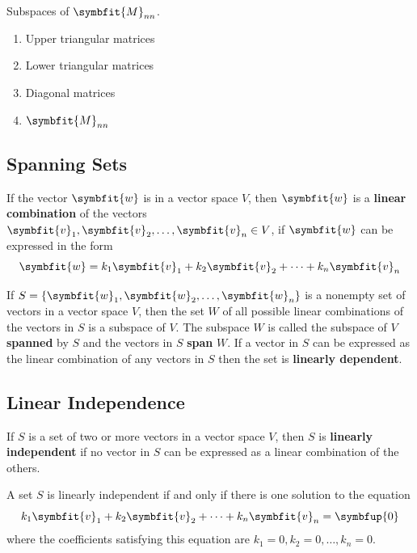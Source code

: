 \documentclass{article}
\begin{document}
	\begin{theorem}
		Subspaces of $\symbfit{M}_{nn}$.
		\begin{enumerate}
			\item Upper triangular matrices
			\item Lower triangular matrices
			\item Diagonal matrices
			\item $\symbfit{M}_{nn}$
		\end{enumerate}
	\end{theorem}
	\subsection{Spanning Sets}
	\begin{definition}
		If the vector $\symbfit{w}$ is in a vector space $V$, then $\symbfit{w}$ is a \textbf{linear combination} of the vectors $\symbfit{v}_1, \symbfit{v}_2, \dots, \symbfit{v}_n \in V$, if $\symbfit{w}$ can be expressed in the form
		\begin{equation*}
			\symbfit{w} = k_1 \symbfit{v}_1 + k_2 \symbfit{v}_2 + \cdots + k_n \symbfit{v}_n
		\end{equation*}
	\end{definition}
	\begin{theorem}
		If $S=\left\{ \symbfit{w}_1, \symbfit{w}_2, \dots, \symbfit{w}_n \right\}$ is a nonempty set of vectors in a vector space $V$, then the set $W$ of all possible linear combinations of the vectors in $S$ is a subspace of $V$. The subspace $W$ is called the subspace of $V$ \textbf{spanned} by $S$ and the vectors in $S$ \textbf{span} $W$. If a vector in $S$ can be expressed as the linear combination of any vectors in $S$ then the set is \textbf{linearly dependent}.
 	\end{theorem}
	\subsection{Linear Independence}
	\begin{definition}
		If $S$ is a set of two or more vectors in a vector space $V$, then $S$ is \textbf{linearly independent} if no vector in $S$ can be expressed as a linear combination of the others. 
	\end{definition}
	\begin{theorem}
		A set $S$ is linearly independent if and only if there is one solution to the equation
		\begin{equation*}
			k_1 \symbfit{v}_1 + k_2 \symbfit{v}_2 + \cdots + k_n \symbfit{v}_n = \symbfup{0}
		\end{equation*} 
		where the coefficients satisfying this equation are $k_1=0, k_2=0, \dots, k_n=0$.
	\end{theorem}
\end{document}
